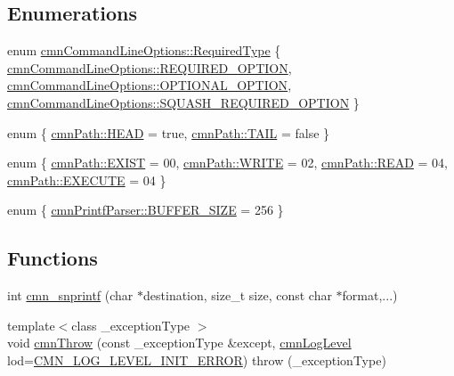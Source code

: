\subsection*{Enumerations}
\begin{DoxyCompactItemize}
\item 
enum \hyperlink{group__cisst_common_gac239a3ca62dd4e3b391824f6f1a97c76}{cmn\+Command\+Line\+Options\+::\+Required\+Type} \{ \hyperlink{group__cisst_common_ggac239a3ca62dd4e3b391824f6f1a97c76a18dad98cb48d91b0fe8ee13a54dc45ff}{cmn\+Command\+Line\+Options\+::\+R\+E\+Q\+U\+I\+R\+E\+D\+\_\+\+O\+P\+T\+I\+O\+N}, 
\hyperlink{group__cisst_common_ggac239a3ca62dd4e3b391824f6f1a97c76a6734a70bf0045a4c08605f3ae473d533}{cmn\+Command\+Line\+Options\+::\+O\+P\+T\+I\+O\+N\+A\+L\+\_\+\+O\+P\+T\+I\+O\+N}, 
\hyperlink{group__cisst_common_ggac239a3ca62dd4e3b391824f6f1a97c76a4078a310faff7e3930603320a15248f7}{cmn\+Command\+Line\+Options\+::\+S\+Q\+U\+A\+S\+H\+\_\+\+R\+E\+Q\+U\+I\+R\+E\+D\+\_\+\+O\+P\+T\+I\+O\+N}
 \}
\item 
enum \{ \hyperlink{group__cisst_common_ggac052729bcebb4fcdcef7eaaa81c21ab9a53c54bb785ea4ed82a051ce4508f152a}{cmn\+Path\+::\+H\+E\+A\+D} = true, 
\hyperlink{group__cisst_common_ggac052729bcebb4fcdcef7eaaa81c21ab9ae473342fccc1ae9e6812eb4e3c192352}{cmn\+Path\+::\+T\+A\+I\+L} = false
 \}
\item 
enum \{ \hyperlink{group__cisst_common_gga15dacf9562d80d5b7eb9b849726e768ca3f33be1cfafa854340d04aa7451978f8}{cmn\+Path\+::\+E\+X\+I\+S\+T} = 00, 
\hyperlink{group__cisst_common_gga15dacf9562d80d5b7eb9b849726e768caaacc5c06046553f65d493b0b02c1421c}{cmn\+Path\+::\+W\+R\+I\+T\+E} = 02, 
\hyperlink{group__cisst_common_gga15dacf9562d80d5b7eb9b849726e768caea0bb09a4a02da90f6c172531cd17a05}{cmn\+Path\+::\+R\+E\+A\+D} = 04, 
\hyperlink{group__cisst_common_gga15dacf9562d80d5b7eb9b849726e768cace4ec4b7133df9a67040ee7de03499fa}{cmn\+Path\+::\+E\+X\+E\+C\+U\+T\+E} = 04
 \}
\item 
enum \{ \hyperlink{group__cisst_common_gga2dbb69cb7aa030799fad9b8d7a1857d5af9f1fd3238867d902ee69418278958a9}{cmn\+Printf\+Parser\+::\+B\+U\+F\+F\+E\+R\+\_\+\+S\+I\+Z\+E} = 256
 \}
\end{DoxyCompactItemize}
\subsection*{Functions}
\begin{DoxyCompactItemize}
\item 
int \hyperlink{group__cisst_common_gaf21f20c37f6fb16a23a0980df1bda1ba}{cmn\+\_\+snprintf} (char $\ast$destination, size\+\_\+t size, const char $\ast$format,...)
\item 
{\footnotesize template$<$class \+\_\+exception\+Type $>$ }\\void \hyperlink{group__cisst_common_gacb3726c72c45ad903298d6b72518b99e}{cmn\+Throw} (const \+\_\+exception\+Type \&except, \hyperlink{cmn_log_lo_d_8h_a70c67165c37a0971e0dd1a85d4edaaae}{cmn\+Log\+Level} lod=\hyperlink{cmn_log_lo_d_8h_a7ad431df88335f9088fc2c38d5199ff8}{C\+M\+N\+\_\+\+L\+O\+G\+\_\+\+L\+E\+V\+E\+L\+\_\+\+I\+N\+I\+T\+\_\+\+E\+R\+R\+O\+R})  throw (\+\_\+exception\+Type)
\end{DoxyCompactItemize}


